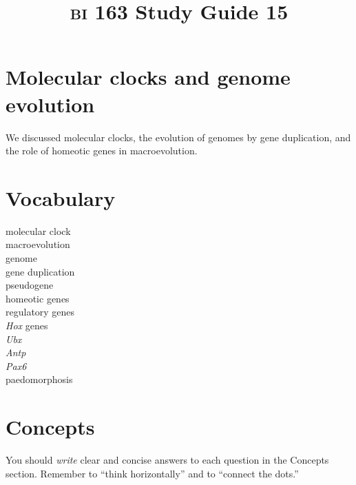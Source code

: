 \documentclass[letterpaper]{tufte-handout}
\title{{\scshape bi} 163 Study Guide 15}
\date{} %
\begin{document}
\maketitle	%

\section*{Molecular clocks and genome evolution}

We discussed molecular clocks, the evolution of genomes by gene duplication, and the role of homeotic genes in macroevolution.

\section*{Vocabulary}

\vspace{-1\baselineskip}
\begin{multicols}{2}
molecular clock \\
macroevolution  \\
genome  \\
gene duplication  \\
pseudogene \\
homeotic genes \\
regulatory genes \\
\textit{Hox} genes \\
\textit{Ubx} \\
\textit{Antp} \\
\textit{Pax6} \\
paedomorphosis

\end{multicols}

\section*{Concepts}

You should \emph{write} clear and concise answers to each question in the Concepts section.  Remember to ``think horizontally'' and to ``connect the dots.'' 
\end{document}
